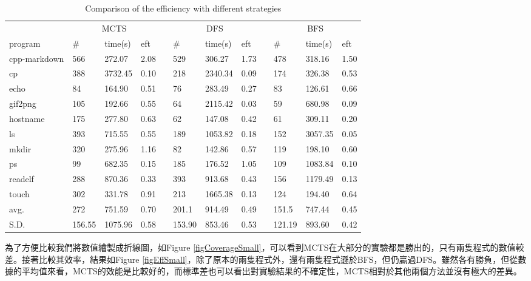 \documentclass[12pt,a4paper,oneside]{book}
\begin{document}
\begin{table}[htbp]
\centering
\caption{Comparison of the efficiency with different strategies}
\label{testMethod}
\begin{tabular}{@{}llllllllllll@{}} \toprule
             & \multicolumn{3}{c}{MCTS} & \phantom{abc} & \multicolumn{3}{c}{DFS} & \phantom{abc} & \multicolumn{3}{c}{BFS} \\ \cmidrule{2-4} \cmidrule{6-8} \cmidrule{10-12}
program      & \#   & time(s)   & eft   & & \#   & time(s)   & eft   & & \#    & time(s)   & eft      \\ \midrule
cpp-markdown & 566    & 272.07 & 2.08 & & 529    & 306.27& 1.73  & & 478     & 318.16 & 1.50   \\
cp           & 388    & 3732.45& 0.10 & & 218    &2340.34& 0.09  & & 174     & 326.38 & 0.53   \\
echo         &  84    & 164.90 & 0.51 & &  76    & 283.49& 0.27  & &  83     & 126.61 & 0.66   \\
gif2png      & 105    & 192.66 & 0.55 & &  64    &2115.42& 0.03  & &  59     & 680.98 & 0.09   \\ 
hostname     & 175    & 277.80 & 0.63 & &  62    & 147.08& 0.42  & &  61     & 309.11 & 0.20   \\
ls           & 393    & 715.55 & 0.55 & & 189    &1053.82& 0.18  & & 152     &3057.35 & 0.05   \\
mkdir        & 320    & 275.96 & 1.16 & &  82    & 142.86& 0.57  & & 119     & 198.10 & 0.60   \\
ps           &  99    & 682.35 & 0.15 & & 185    & 176.52& 1.05  & & 109     &1083.84 & 0.10   \\
readelf      & 288    & 870.36 & 0.33 & & 393    & 913.68& 0.43  & & 156     &1179.49 & 0.13   \\
touch        & 302    & 331.78 & 0.91 & & 213    &1665.38& 0.13  & & 124     & 194.40 & 0.64   \\ \hline
avg.         & 272    & 751.59 & 0.70 & & 201.1  & 914.49& 0.49  & & 151.5   & 747.44 & 0.45   \\
S.D.         & 156.55 &1075.96 & 0.58 & & 153.90 & 853.46& 0.53  & & 121.19  & 893.60 & 0.42   \\ \bottomrule
\end{tabular}
\end{table}

為了方便比較我們將數值繪製成折線圖，如Figure \ref{figCoverageSmall}，可以看到MCTS在大部分的實驗都是勝出的，只有兩隻程式的數值較差。接著比較其效率，結果如Figure \ref{figEffSmall}，除了原本的兩隻程式外，還有兩隻程式遜於BFS，但仍贏過DFS。雖然各有勝負，但從數據的平均值來看，MCTS的效能是比較好的，而標準差也可以看出對實驗結果的不確定性，MCTS相對於其他兩個方法並沒有極大的差異。
\end{document}
